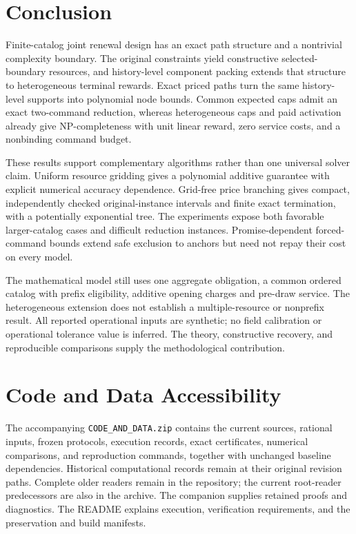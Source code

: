 \section{Conclusion}
Finite-catalog joint renewal design has an exact path structure and a nontrivial complexity boundary. The original constraints yield constructive selected-boundary resources, and history-level component packing extends that structure to heterogeneous terminal rewards. Exact priced paths turn the same history-level supports into polynomial node bounds. Common expected caps admit an exact two-command reduction, whereas heterogeneous caps and paid activation already give NP-completeness with unit linear reward, zero service costs, and a nonbinding command budget.

These results support complementary algorithms rather than one universal solver claim. Uniform resource gridding gives a polynomial additive guarantee with explicit numerical accuracy dependence. Grid-free price branching gives compact, independently checked original-instance intervals and finite exact termination, with a potentially exponential tree. The experiments expose both favorable larger-catalog cases and difficult reduction instances. Promise-dependent forced-command bounds extend safe exclusion to anchors but need not repay their cost on every model.

The mathematical model still uses one aggregate obligation, a common ordered catalog with prefix eligibility, additive opening charges and pre-draw service. The heterogeneous extension does not establish a multiple-resource or nonprefix result. All reported operational inputs are synthetic; no field calibration or operational tolerance value is inferred. The theory, constructive recovery, and reproducible comparisons supply the methodological contribution.

\section*{Code and Data Accessibility}
The accompanying \texttt{CODE\_AND\_DATA.zip} contains the current sources, rational inputs, frozen protocols, execution records, exact certificates, numerical comparisons, and reproduction commands, together with unchanged baseline dependencies. Historical computational records remain at their original revision paths. Complete older readers remain in the repository; the current root-reader predecessors are also in the archive. The companion supplies retained proofs and diagnostics. The README explains execution, verification requirements, and the preservation and build manifests.
